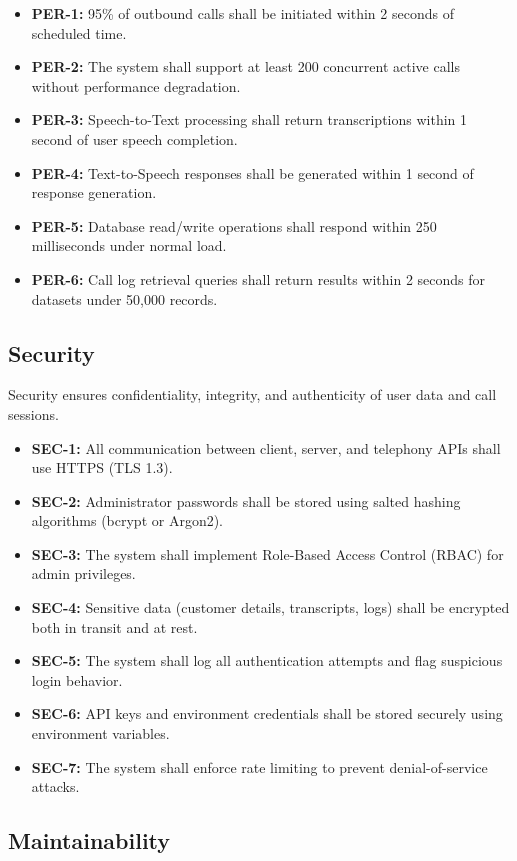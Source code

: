 \documentclass[12pt,a4paper]{report}
\begin{document}
\begin{itemize}
\item \textbf{PER-1:} 95\% of outbound calls shall be initiated within 2 seconds of scheduled time.
\item \textbf{PER-2:} The system shall support at least 200 concurrent active calls without performance degradation.
\item \textbf{PER-3:} Speech-to-Text processing shall return transcriptions within 1 second of user speech completion.
\item \textbf{PER-4:} Text-to-Speech responses shall be generated within 1 second of response generation.
\item \textbf{PER-5:} Database read/write operations shall respond within 250 milliseconds under normal load.
\item \textbf{PER-6:} Call log retrieval queries shall return results within 2 seconds for datasets under 50,000 records.
\end{itemize}
\subsection{Security}

Security ensures confidentiality, integrity, and authenticity of user data and call sessions.

\begin{itemize}
\item \textbf{SEC-1:} All communication between client, server, and telephony APIs shall use HTTPS (TLS 1.3).
\item \textbf{SEC-2:} Administrator passwords shall be stored using salted hashing algorithms (bcrypt or Argon2).
\item \textbf{SEC-3:} The system shall implement Role-Based Access Control (RBAC) for admin privileges.
\item \textbf{SEC-4:} Sensitive data (customer details, transcripts, logs) shall be encrypted both in transit and at rest.
\item \textbf{SEC-5:} The system shall log all authentication attempts and flag suspicious login behavior.
\item \textbf{SEC-6:} API keys and environment credentials shall be stored securely using environment variables.
\item \textbf{SEC-7:} The system shall enforce rate limiting to prevent denial-of-service attacks.
\end{itemize}
\subsection{Maintainability}
\end{document}
